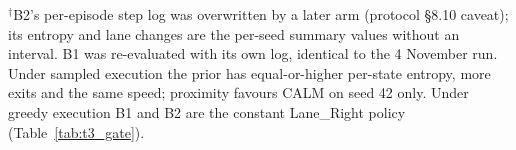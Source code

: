 \begin{table}[t]
{\begin{tabular}{lcccccc}
\bottomrule
\end{tabular}}
\vspace{1mm}
\parbox{\textwidth}{\scriptsize $^\dagger$B2's per-episode step log was overwritten by a later arm (protocol \S8.10 caveat); its entropy and lane changes are the per-seed summary values without an interval. B1 was re-evaluated with its own log, identical to the 4 November run. Under sampled execution the prior has equal-or-higher per-state entropy, more exits and the same speed; proximity favours CALM on seed 42 only. Under greedy execution B1 and B2 are the constant Lane\_Right policy (Table~\ref{tab:t3_gate}).}
\end{table}
